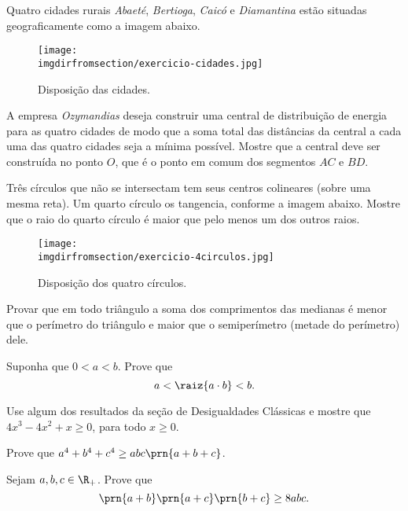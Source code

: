 \begin{exercise}
	Quatro cidades rurais \emph{Abaeté}, \emph{Bertioga}, \emph{Caicó} e \emph{Diamantina} estão situadas geograficamente como a imagem abaixo.
	\begin{figure}[H]
		\centering
		\label{fig:exercicio-cidades}
		\texttt{[image: \\imgdirfromsection/exercicio-cidades.jpg]}
		\caption{Disposição das cidades.}
	\end{figure}
	A empresa \emph{Ozymandias} deseja construir uma central de distribuição de energia para as quatro cidades de modo que a soma total das distâncias da central a cada uma das quatro cidades seja a mínima possível. Mostre que a central deve ser construída no ponto $O$, que é o ponto em comum dos segmentos $AC$ e $BD$.
\end{exercise}

\begin{exercise}
  Três círculos que não se intersectam tem seus centros colineares (sobre uma mesma reta). Um quarto círculo os tangencia, conforme a imagem abaixo. Mostre que o raio do quarto círculo é maior que pelo menos um dos outros raios.
  \begin{figure}[H]
		\centering
		\label{fig:exercicio-4circulos}
    \texttt{[image: \\imgdirfromsection/exercicio-4circulos.jpg]}
		\caption{Disposição dos quatro círculos.}
	\end{figure}
\end{exercise}

\begin{exercise}
Provar que em todo triângulo a soma dos comprimentos das
medianas é menor que o perímetro do triângulo e maior que o
semiperímetro (metade do perímetro) dele.
\end{exercise}

\begin{exercise}
  Suponha que $0 < a < b$. Prove que
$$a < \raiz{a \cdot b} < b.$$
\end{exercise}

\begin{exercise}
  Use algum dos resultados da seção de Desigualdades Clássicas e mostre que $4x^3 - 4 x^2 + x \geq 0$, para todo $x \geq 0$.
\end{exercise}

\begin{exercise}
Prove que $a^4 +b^4 +c^4 \geq abc \prn{a+b+c}$.
\end{exercise}

\begin{exercise}
Sejam $a, b, c \in \R_+$. Prove que $$\prn {a+b} \prn {a+c}
\prn {b+c} \geq 8abc.$$
\end{exercise}

